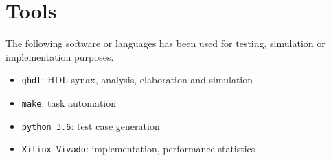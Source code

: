 \section{Tools}
The following software or languages has been used for testing, simulation or
implementation purposes.

\begin{itemize}
  \item \texttt{ghdl}: HDL synax, analysis, elaboration and simulation
  \item \texttt{make}: task automation
  \item \texttt{python 3.6}: test case generation
  \item \texttt{Xilinx Vivado}: implementation, performance statistics
\end{itemize}
